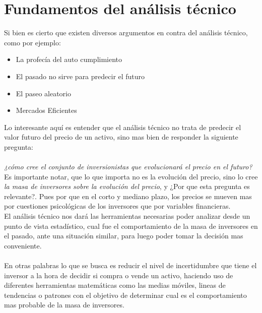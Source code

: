 \section{Fundamentos del análisis técnico}

Si bien es cierto que existen diversos argumentos en contra del análisis técnico, como por ejemplo:

\begin{itemize}
	\item La profecía del auto cumplimiento
	\item El pasado no sirve para predecir el futuro
	\item El paseo aleatorio
	\item Mercados Eficientes
\end{itemize}

Lo interesante aquí es entender que el análisis técnico no trata de predecir el valor futuro del precio de un activo, sino mas bien de responder la siguiente pregunta:\\\\

\emph{¿cómo cree el conjunto de inversionistas que evolucionará el precio en el futuro? }
\\

Es importante notar, que lo que importa no es la evolución del precio, sino lo cree \emph{la masa de inversores sobre la evolución del precio}, y ¿Por que esta pregunta es relevante?. Pues por que en el corto y mediano plazo, los precios se mueven mas por cuestiones psicológicas de los inversores que por variables financieras.\\

El análisis técnico nos dará las herramientas necesarias poder analizar desde un punto de vista estadístico, cual fue el comportamiento de la masa de inversores en el pasado, ante una situación similar, para luego poder tomar la decisión mas conveniente.
\\\\
En otras palabras lo que se busca es reducir el nivel de incertidumbre que tiene el inversor a la hora de decidir si compra o vende un activo, haciendo uso de diferentes herramientas matemáticas como las medias móviles, lineas de tendencias o patrones con el objetivo de determinar cual es el comportamiento mas probable de la masa de inversores.


